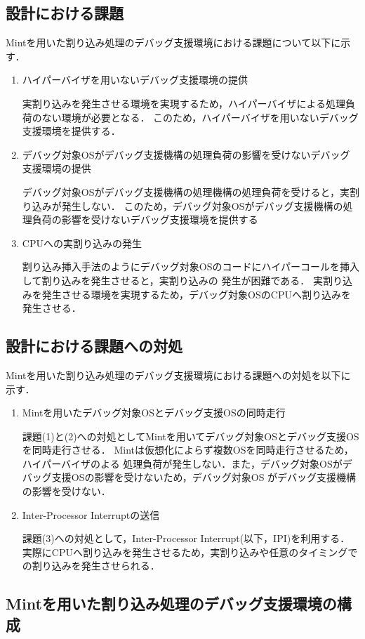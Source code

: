 \documentclass[12pt]{jsarticle}
\begin{document}
\subsection{設計における課題}
Mintを用いた割り込み処理のデバッグ支援環境における課題について以下に示す．
\begin{enumerate}
\item ハイパーバイザを用いないデバッグ支援環境の提供

実割り込みを発生させる環境を実現するため，ハイパーバイザによる処理負荷のない環境が必要となる．
このため，ハイパーバイザを用いないデバッグ支援環境を提供する．
\item デバッグ対象OSがデバッグ支援機構の処理負荷の影響を受けないデバッグ支援環境の提供

デバッグ対象OSがデバッグ支援機構の処理機構の処理負荷を受けると，実割り込みが発生しない．
このため，デバッグ対象OSがデバッグ支援機構の処理負荷の影響を受けないデバッグ支援環境を提供する
\item CPUへの実割り込みの発生

割り込み挿入手法のようにデバッグ対象OSのコードにハイパーコールを挿入して割り込みを発生させると，実割り込みの
発生が困難である．
実割り込みを発生させる環境を実現するため，デバッグ対象OSのCPUへ割り込みを発生させる．

\end{enumerate}
\subsection{設計における課題への対処}
Mintを用いた割り込み処理のデバッグ支援環境における課題への対処を以下に示す．
\begin{enumerate}
\item Mintを用いたデバッグ対象OSとデバッグ支援OSの同時走行

課題(1)と(2)への対処としてMintを用いてデバッグ対象OSとデバッグ支援OSを同時走行させる．
Mintは仮想化によらず複数OSを同時走行させるため，ハイパーバイザのよる
処理負荷が発生しない．また，デバッグ対象OSがデバッグ支援OSの影響を受けないため，デバッグ対象OS
がデバッグ支援機構の影響を受けない．
\item Inter-Processor Interruptの送信

課題(3)への対処として，Inter-Processor Interrupt(以下，IPI)を利用する．
実際にCPUへ割り込みを発生させるため，実割り込みや任意のタイミングでの割り込みを発生させられる．
\end{enumerate}
\subsection{Mintを用いた割り込み処理のデバッグ支援環境の構成}
\end{document}
